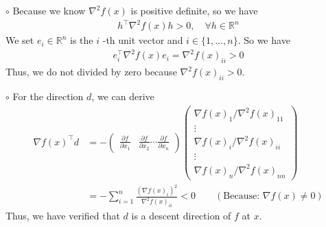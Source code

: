 \documentclass{article}
\begin{document}
$\circ$ Because we know $\nabla^{2} f(x)$ is positive definite, so we have
\begin{equation}
	\begin{split}
		h^{\top}\nabla^{2} f(x)h>0, \quad\forall h\in\mathbb{R}^n
	\end{split}
\end{equation}
We set $e_{i} \in \mathbb{R}^{n}$ is the $i$ -th unit vector and $i \in\{1, \ldots, n\}$. So we have 
\begin{equation}
	\begin{split}
		e_i^{\top}\nabla^{2}f(x)e_i=\nabla^{2} f(x)_{i i}>0
	\end{split}
\end{equation}
Thus, we do not divided by zero because $\nabla^{2} f(x)_{i i}>0$.

$\circ$ For the direction $d$, we can derive
\begin{equation}
	\begin{split}
		\nabla f(x)^{\top}d&=-
		\begin{pmatrix}
			\frac{\partial f}{\partial x_{1}}&\frac{\partial f}{\partial x_{2}} \cdots \frac{\partial f}{\partial x_{n}}
		\end{pmatrix}
		\begin{pmatrix}
			\nabla f(x)_{1}/\nabla^{2} f(x)_{1 1}\\
			\vdots\\
			\nabla f(x)_{i}/\nabla^{2} f(x)_{i i}\\
			\vdots\\
			\nabla f(x)_{n}/\nabla^{2} f(x)_{n n}
		\end{pmatrix}\\
		&=-\sum_{i=1}^{n}\frac{\left(\nabla f(x)_{i}\right)^2}{\nabla^{2} f(x)_{i i}}<0 \qquad \left(\text{Because: } \nabla f(x)\neq 0\right)
	\end{split}
\end{equation}
Thus, we have verified that $d$ is a descent direction of $f$ at $x$.
\end{document}
